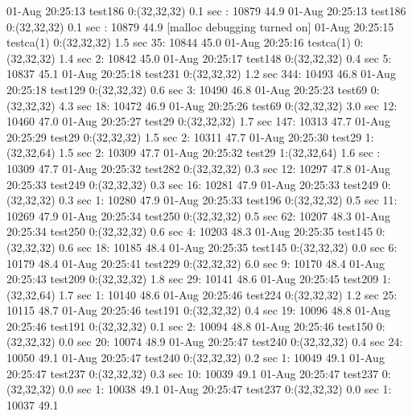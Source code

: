 01-Aug 20:25:13 test186     0:(32,32,32)     0.1 sec     : 10879 44.9%
01-Aug 20:25:13 test186     0:(32,32,32)     0.1 sec     : 10879 44.9%
[malloc debugging turned on]
01-Aug 20:25:15 testca(1)   0:(32,32,32)     1.5 sec   35: 10844 45.0%
01-Aug 20:25:16 testca(1)   0:(32,32,32)     1.4 sec    2: 10842 45.0%
01-Aug 20:25:17 test148     0:(32,32,32)     0.4 sec    5: 10837 45.1%
01-Aug 20:25:18 test231     0:(32,32,32)     1.2 sec  344: 10493 46.8%
01-Aug 20:25:18 test129     0:(32,32,32)     0.6 sec    3: 10490 46.8%
01-Aug 20:25:23 test69      0:(32,32,32)     4.3 sec   18: 10472 46.9%
01-Aug 20:25:26 test69      0:(32,32,32)     3.0 sec   12: 10460 47.0%
01-Aug 20:25:27 test29      0:(32,32,32)     1.7 sec  147: 10313 47.7%
01-Aug 20:25:29 test29      0:(32,32,32)     1.5 sec    2: 10311 47.7%
01-Aug 20:25:30 test29      1:(32,32,64)     1.5 sec    2: 10309 47.7%
01-Aug 20:25:32 test29      1:(32,32,64)     1.6 sec     : 10309 47.7%
01-Aug 20:25:32 test282     0:(32,32,32)     0.3 sec   12: 10297 47.8%
01-Aug 20:25:33 test249     0:(32,32,32)     0.3 sec   16: 10281 47.9%
01-Aug 20:25:33 test249     0:(32,32,32)     0.3 sec    1: 10280 47.9%
01-Aug 20:25:33 test196     0:(32,32,32)     0.5 sec   11: 10269 47.9%
01-Aug 20:25:34 test250     0:(32,32,32)     0.5 sec   62: 10207 48.3%
01-Aug 20:25:34 test250     0:(32,32,32)     0.6 sec    4: 10203 48.3%
01-Aug 20:25:35 test145     0:(32,32,32)     0.6 sec   18: 10185 48.4%
01-Aug 20:25:35 test145     0:(32,32,32)     0.0 sec    6: 10179 48.4%
01-Aug 20:25:41 test229     0:(32,32,32)     6.0 sec    9: 10170 48.4%
01-Aug 20:25:43 test209     0:(32,32,32)     1.8 sec   29: 10141 48.6%
01-Aug 20:25:45 test209     1:(32,32,64)     1.7 sec    1: 10140 48.6%
01-Aug 20:25:46 test224     0:(32,32,32)     1.2 sec   25: 10115 48.7%
01-Aug 20:25:46 test191     0:(32,32,32)     0.4 sec   19: 10096 48.8%
01-Aug 20:25:46 test191     0:(32,32,32)     0.1 sec    2: 10094 48.8%
01-Aug 20:25:46 test150     0:(32,32,32)     0.0 sec   20: 10074 48.9%
01-Aug 20:25:47 test240     0:(32,32,32)     0.4 sec   24: 10050 49.1%
01-Aug 20:25:47 test240     0:(32,32,32)     0.2 sec    1: 10049 49.1%
01-Aug 20:25:47 test237     0:(32,32,32)     0.3 sec   10: 10039 49.1%
01-Aug 20:25:47 test237     0:(32,32,32)     0.0 sec    1: 10038 49.1%
01-Aug 20:25:47 test237     0:(32,32,32)     0.0 sec    1: 10037 49.1%
